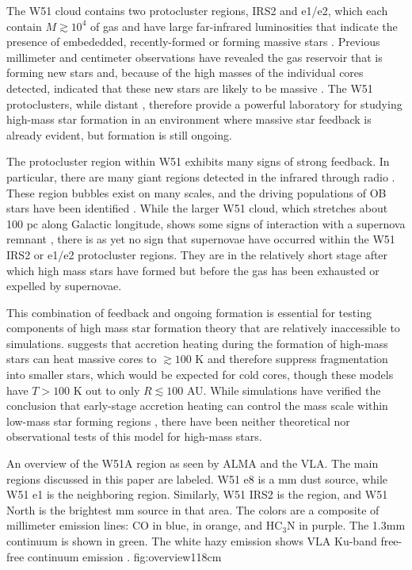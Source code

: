 \documentclass{emulateapj}
\begin{document}
The W51 cloud contains two protocluster regions, IRS2 and e1/e2, which each
contain $M\gtrsim10^4$ \msun of gas and have large far-infrared luminosities
that
indicate the presence of embededded, recently-formed or forming massive stars
\citep{Harvey1986a,Sievers1991a,Ginsburg2012a,Ginsburg2016b}.  Previous
millimeter and centimeter observations have revealed the gas reservoir
that is forming new stars and, because of the high masses of the individual
cores detected, indicated that these new stars are likely to be massive
\citep{Zhang1997a,Eisner2002a,Zapata2009a,Tang2009a,
Zapata2010a,Shi2010b,Shi2010a,Koch2010a,Koch2012a,Koch2012b,Tang2012a,Goddi2016a}.  The
W51 protoclusters, while distant \citep[5.4 kpc;][]{Sato2010a}, therefore
provide a powerful laboratory for studying high-mass star formation in an
environment where massive star feedback is already evident, but 
formation is still ongoing.

The protocluster region within W51 exhibits many signs of strong feedback.  In
particular, there are many giant \hii regions detected in the infrared through
radio \citep{Mehringer1994a,Ginsburg2015a}.  These \hii region bubbles exist
on many scales, and the driving populations of OB stars have been identified
\citep{Kumar2004a,Ginsburg2016a}.  While the larger W51 cloud, which stretches
about 100 pc along Galactic longitude, shows some signs of interaction with a
supernova remnant \citep{Brogan2013a,Ginsburg2015a}, there is as yet no
sign that supernovae have occurred within the W51 IRS2 or e1/e2 protocluster
regions.  They are in the relatively short stage after which high mass stars
have formed but before the gas has been exhausted or expelled by supernovae.

This combination of feedback and ongoing formation is essential for testing
components of high mass star formation theory that are relatively inaccessible
to simulations.  \citet{Krumholz2006a} suggests that accretion heating during
the formation of high-mass stars can heat massive cores to $\gtrsim100$ K and
therefore suppress fragmentation into smaller stars, which would be expected
for cold cores, though these models have $T>100$ K out to only $R\lesssim100$
AU.  While simulations have verified the conclusion that early-stage accretion
heating can control the mass scale within low-mass star
forming regions \citep{Krumholz2007c,Offner2011b, Bate2012a,Bate2014b}, there
have been neither theoretical nor observational tests of this model for
high-mass stars. 

{An overview of the W51A region as seen by ALMA and the VLA.  The main regions
discussed in this paper are labeled.  W51 e8 is a mm dust source, while W51 e1
is the neighboring \hii region.  Similarly, W51 IRS2 is the \hii region, and
W51 North is the brightest mm source in that area.  The colors are a composite
of millimeter emission lines: CO in blue, \methanol in orange, and HC$_3$N in
purple.  The 1.3mm continuum is shown in green.  The white hazy emission
shows VLA Ku-band free-free continuum emission
\citep{Ginsburg2016b}.}
{fig:overview}{1}{18cm}
\end{document}
